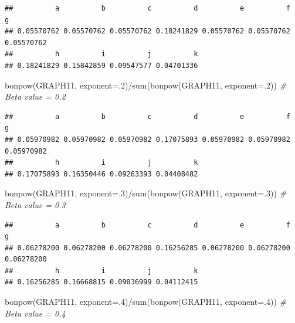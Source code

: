 \documentclass[
  notitlepage,
  onecolumn,
  openany]{book}
\newenvironment{Shaded}{\begin{snugshade}}{\end{snugshade}}
\newcommand{\AttributeTok}[1]{\textcolor[rgb]{0.77,0.63,0.00}{#1}}
\newcommand{\CommentTok}[1]{\textcolor[rgb]{0.56,0.35,0.01}{\textit{#1}}}
\newcommand{\DecValTok}[1]{\textcolor[rgb]{0.00,0.00,0.81}{#1}}
\newcommand{\FunctionTok}[1]{\textcolor[rgb]{0.00,0.00,0.00}{#1}}
\newcommand{\NormalTok}[1]{#1}
\newcommand{\SpecialCharTok}[1]{\textcolor[rgb]{0.00,0.00,0.00}{#1}}
\begin{document}
\begin{verbatim}
##          a          b          c          d          e          f          g 
## 0.05570762 0.05570762 0.05570762 0.18241829 0.05570762 0.05570762 0.05570762 
##          h          i          j          k 
## 0.18241829 0.15842859 0.09547577 0.04701336
\end{verbatim}

\begin{Shaded}
\begin{Highlighting}[]
\FunctionTok{bonpow}\NormalTok{(GRAPH11, }\AttributeTok{exponent=}\NormalTok{.}\DecValTok{2}\NormalTok{)}\SpecialCharTok{/}\FunctionTok{sum}\NormalTok{(}\FunctionTok{bonpow}\NormalTok{(GRAPH11, }\AttributeTok{exponent=}\NormalTok{.}\DecValTok{2}\NormalTok{)) }\CommentTok{\# Beta value = 0.2}
\end{Highlighting}
\end{Shaded}

\begin{verbatim}
##          a          b          c          d          e          f          g 
## 0.05970982 0.05970982 0.05970982 0.17075893 0.05970982 0.05970982 0.05970982 
##          h          i          j          k 
## 0.17075893 0.16350446 0.09263393 0.04408482
\end{verbatim}

\begin{Shaded}
\begin{Highlighting}[]
\FunctionTok{bonpow}\NormalTok{(GRAPH11, }\AttributeTok{exponent=}\NormalTok{.}\DecValTok{3}\NormalTok{)}\SpecialCharTok{/}\FunctionTok{sum}\NormalTok{(}\FunctionTok{bonpow}\NormalTok{(GRAPH11, }\AttributeTok{exponent=}\NormalTok{.}\DecValTok{3}\NormalTok{)) }\CommentTok{\# Beta value = 0.3}
\end{Highlighting}
\end{Shaded}

\begin{verbatim}
##          a          b          c          d          e          f          g 
## 0.06278200 0.06278200 0.06278200 0.16256285 0.06278200 0.06278200 0.06278200 
##          h          i          j          k 
## 0.16256285 0.16668815 0.09036999 0.04112415
\end{verbatim}

\begin{Shaded}
\begin{Highlighting}[]
\FunctionTok{bonpow}\NormalTok{(GRAPH11, }\AttributeTok{exponent=}\NormalTok{.}\DecValTok{4}\NormalTok{)}\SpecialCharTok{/}\FunctionTok{sum}\NormalTok{(}\FunctionTok{bonpow}\NormalTok{(GRAPH11, }\AttributeTok{exponent=}\NormalTok{.}\DecValTok{4}\NormalTok{)) }\CommentTok{\# Beta value = 0.4}
\end{Highlighting}
\end{Shaded}
\end{document}
